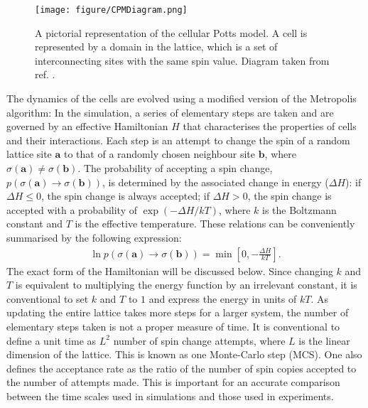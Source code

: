 \documentclass[a4paper,12pt]{article}
\newcommand{\inc}{\Delta}
\begin{document}
\begin{figure}[h]
\centering
\texttt{[image: figure/CPMDiagram.png]}
\caption{A pictorial representation of the cellular Potts model. A cell is represented by a domain in the lattice, which is a set of interconnecting sites with the same spin value. Diagram taken from ref. \cite{singlecell}.}
\label{fig:CPM}
\end{figure}

The dynamics of the cells are evolved using a modified version of the Metropolis algorithm: In the simulation, a series of elementary steps are taken and are governed by an effective Hamiltonian $H$ that characterises the properties of cells and their interactions. Each step is an attempt to change the spin of a random lattice site $\bm{a}$ to that of a randomly chosen neighbour site $\bm{b}$, where $\sigma(\bm{a}) \neq \sigma(\bm{b})$. The probability of accepting a spin change, $p\left(\sigma(\bm{a}) \rightarrow \sigma(\bm{b})\right)$, is determined by the associated change in energy ($\inc H$): if $\inc H \leq 0$, the spin change is always accepted; if $\inc H > 0$, the spin change is accepted with a probability of $\exp(-\inc H / kT)$, where $k$ is the Boltzmann constant and $T$ is the effective temperature. These relations can be conveniently summarised by the following expression:
\begin{eqnarray}
\ln p\left(\sigma(\bm{a}) \rightarrow \sigma(\bm{b})\right) = \min\left[0,-\frac{\inc H}{kT}\right].
\end{eqnarray}
The exact form of the Hamiltonian will be discussed below. Since changing $k$ and $T$ is equivalent to multiplying the energy function by an irrelevant constant, it is conventional to set $k$ and $T$ to $1$ and express the energy in units of $kT$. As updating the entire lattice takes more steps for a larger system, the number of elementary steps taken is not a proper measure of time. It is conventional to define a unit time as $L^2$ number of spin change attempts, where $L$ is the linear dimension of the lattice. This is known as one Monte-Carlo step (MCS). One also defines the acceptance rate as the ratio of the number of spin copies accepted to the number of attempts made. This is important for an accurate comparison between the time scales used in simulations and those used in experiments\cite{sanz2010}.
\end{document}
